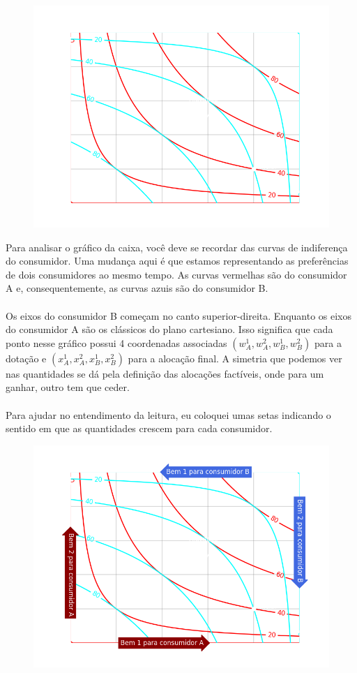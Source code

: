 \documentclass[a4paper,11pt,oneside]{book}
\theoremstyle{definition}
\theoremstyle{break}
\begin{document}
\begin{figure}[H]
\centering
\includegraphics[scale=0.8]{cap32_1-caixa_edgeworth_1.png}
\end{figure}

Para analisar o gráfico da caixa, você deve se recordar das curvas de indiferença do consumidor. Uma mudança aqui é que estamos representando as preferências de dois consumidores ao mesmo tempo. As curvas vermelhas são do consumidor A e, consequentemente, as curvas azuis são do consumidor B.
\\
\\
Os eixos do consumidor B começam no canto superior-direita. Enquanto os eixos do consumidor A são os clássicos do plano cartesiano. Isso significa que cada ponto nesse gráfico possui 4 coordenadas associadas $(w_A^1, w_A^2, w_B^1, w_B^2)$ para a dotação e $(x_A^1, x_A^2, x_B^1, x_B^2)$ para a alocação final. A simetria que podemos ver nas quantidades se dá pela definição das alocações factíveis, onde para um ganhar, outro tem que ceder. 
\\
\\
Para ajudar no entendimento da leitura, eu coloquei umas setas indicando o sentido em que as quantidades crescem para cada consumidor.

\begin{figure}[H]
\centering
\includegraphics[scale=0.8]{cap32_1-caixa_edgeworth_2.png}
\end{figure}
\end{document}
